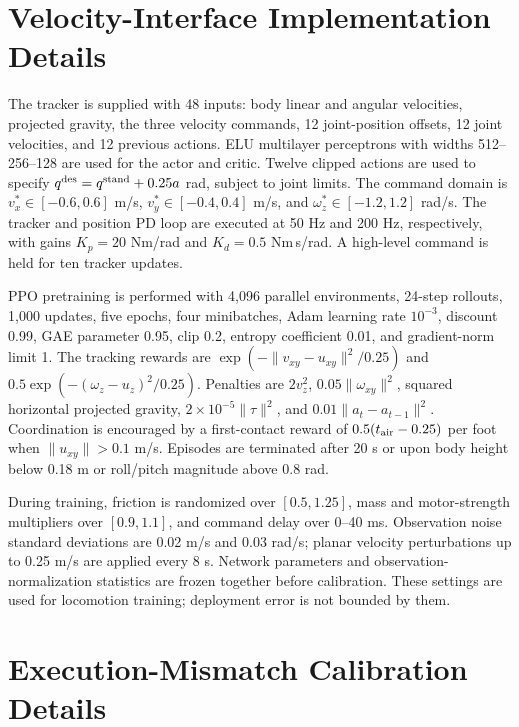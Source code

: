 \documentclass[conference]{IEEEtran}
\begin{document}
\section{Velocity-Interface Implementation Details}
\label{app:velocity_interface}
The tracker is supplied with 48 inputs: body linear and angular velocities, projected
gravity, the three velocity commands, 12 joint-position offsets, 12 joint
velocities, and 12 previous actions. ELU multilayer perceptrons with widths
512--256--128 are used for the actor and critic. Twelve clipped actions are used to specify
$q^{\rm des}=q^{\rm stand}+0.25a$ rad, subject to joint limits.
The command domain is $v_x^*\in[-0.6,0.6]$ m/s,
$v_y^*\in[-0.4,0.4]$ m/s, and $\omega_z^*\in[-1.2,1.2]$ rad/s.
The tracker and position PD loop are executed at 50 Hz and 200 Hz, respectively, with gains
$K_p=20$ Nm/rad and $K_d=0.5$ Nm\,s/rad. A high-level command is held for
ten tracker updates.

PPO pretraining is performed with 4,096 parallel environments, 24-step rollouts, 1,000
updates, five epochs, four minibatches, Adam learning rate $10^{-3}$,
discount 0.99, GAE parameter 0.95, clip 0.2, entropy coefficient 0.01,
and gradient-norm limit 1. The tracking rewards are
$\exp(-\|v_{xy}-u_{xy}\|^2/0.25)$ and
$0.5\exp(-(\omega_z-u_z)^2/0.25)$. Penalties are
$2v_z^2$, $0.05\|\omega_{xy}\|^2$, squared horizontal projected gravity,
$2{\times}10^{-5}\|\tau\|^2$, and $0.01\|a_t-a_{t-1}\|^2$.
Coordination is encouraged by a first-contact reward of $0.5(t_{\rm air}-0.25)$
per foot when $\|u_{xy}\|>0.1$ m/s. Episodes are terminated after 20 s or upon
body height below 0.18 m or roll/pitch magnitude above 0.8 rad.

During training, friction is randomized over $[0.5,1.25]$, mass and motor-strength
multipliers over $[0.9,1.1]$, and command delay over 0--40 ms. Observation
noise standard deviations are 0.02 m/s and 0.03 rad/s; planar velocity
perturbations up to 0.25 m/s are applied every 8 s. Network parameters and
observation-normalization statistics are frozen together before calibration.
These settings are used for locomotion training; deployment error is not bounded by them.

\section{Execution-Mismatch Calibration Details}
\label{app:calibration_details}
\end{document}
